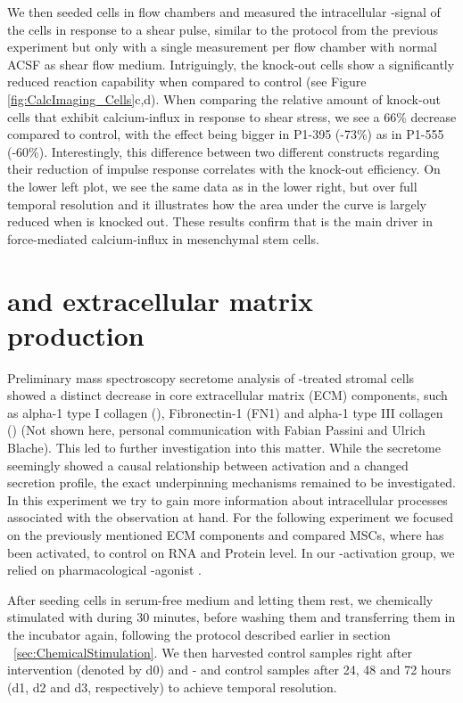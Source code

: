 We then seeded cells in flow chambers and measured the intracellular \calcium{}-signal of the cells in response to a shear pulse, similar to the protocol from the previous experiment but only with a single measurement per flow chamber with normal ACSF as shear flow medium. Intriguingly, the \PiezoGene{} knock-out cells show a significantly reduced reaction capability when compared to control (see Figure \ref{fig:CalcImaging_Cells}c,d). When comparing the relative amount of knock-out cells that exhibit calcium-influx in response to shear stress, we see a 66\% decrease compared to control, with the effect being bigger in P1-395 (-73\%) as in P1-555 (-60\%). Interestingly, this difference between two different constructs regarding their reduction of impulse response correlates with the knock-out efficiency. On the lower left plot, we see the same data as in the lower right, but over full temporal resolution and it illustrates how the area under the curve is largely reduced when \Piezo{} is knocked out. 
These results confirm that \Piezo{} is the main driver in force-mediated calcium-influx in mesenchymal stem cells.

\section{\Piezo{} and extracellular matrix production}
\label{sec:PiezoandECM}

Preliminary mass spectroscopy secretome analysis of \Yoda-treated stromal cells showed a distinct decrease in core extracellular matrix (ECM) components, such as alpha-1 type I collagen (\colone), Fibronectin-1 (FN1) and alpha-1 type III collagen (\colthree) (Not shown here, personal communication with Fabian Passini and Ulrich Blache). This led to further investigation into this matter. While the secretome seemingly showed a causal relationship between \Piezo{} activation and a changed secretion profile, the exact underpinning mechanisms remained to be investigated. In this experiment we try to gain more information about intracellular processes associated with the observation at hand. For the following experiment we focused on the previously mentioned ECM components and compared MSCs, where \Piezo{} has been activated, to control on RNA and Protein level. In our \Piezo{}-activation group, we relied on pharmacological \Piezo{}-agonist \Yoda{}.\par

After seeding cells in serum-free medium and letting them rest, we chemically stimulated \Piezo{} with \Yoda{} during 30 minutes, before washing them and transferring them in the incubator again, following the protocol described earlier in section ~\vref{sec:ChemicalStimulation}. We then harvested control samples right after intervention (denoted by d0) and \Yoda{}- and control samples after 24, 48 and 72 hours (d1, d2 and d3, respectively) to achieve temporal resolution. \par

